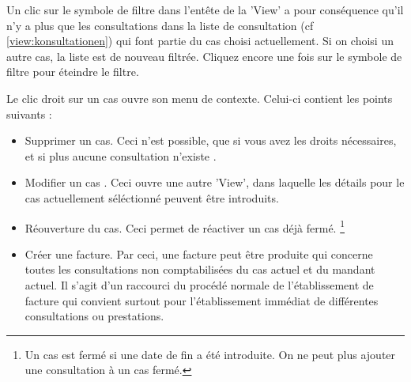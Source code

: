 \medskip

\label{filter:fall}
Un clic sur le symbole de filtre dans l'entête de la 'View' a pour conséquence qu'il n'y a plus que les consultations dans la liste de consultation (cf \ref{view:konsultationen}) qui font partie du cas choisi actuellement. Si on choisi un autre cas, la liste est de nouveau filtrée. Cliquez encore une fois sur le symbole de filtre pour éteindre le filtre.

Le clic droit sur un cas ouvre son menu de contexte. Celui-ci contient les points
suivants :

\begin{itemize}
  \item {Supprimer un cas}. Ceci n'est possible, que si vous avez les droits nécessaires, et si plus aucune consultation n'existe .
  \item {Modifier un cas }. Ceci ouvre une autre 'View', dans laquelle les détails pour le cas actuellement séléctionné peuvent être introduits.
  \item {Réouverture du cas}. Ceci permet de réactiver un cas déjà fermé. \footnote{Un cas est fermé si une date de fin a été introduite. On ne peut plus ajouter une consultation à un cas fermé.}
  \item {Créer une facture}. Par ceci, une facture peut être produite qui concerne toutes les consultations non comptabilisées du cas actuel et du mandant actuel. Il s'agit d'un \glqq raccourci\grqq{} du procédé normale de l'établissement de facture qui convient surtout pour l'établissement immédiat de différentes consultations ou prestations.
\end{itemize}



